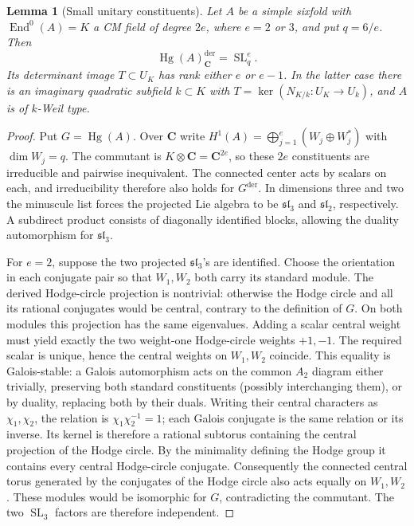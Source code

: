 \documentclass[11pt,reqno]{article}
\theoremstyle{emphasizedplain}
\theoremstyle{emphasizeddefinition}
\theoremstyle{emphasizeddefinition}
\newtheorem{prelemma}{Lemma}
\DeclareMathOperator{\End}{End}
\DeclareMathOperator{\Hg}{Hg}
\DeclareMathOperator{\SL}{SL}
\newcommand{\C}{\mathbf C}
\newcommand{\dd}{\mathrm{der}}
\begin{document}
\begin{prelemma}[Small unitary constituents]\label{p:smallunitary}
Let $A$ be a simple sixfold with $\End^0(A)=K$ a CM field of degree
$2e$, where $e=2$ or $3$, and put $q=6/e$. Then
\[
 \Hg(A)_\C^{\dd}=\SL_q^e.
\]
Its determinant image $T\subset U_K$ has rank either $e$ or $e-1$.
In the latter case there is an imaginary quadratic subfield $k\subset K$
with $T=\ker(N_{K/k}:U_K\to U_k)$, and $A$ is of $k$-Weil type.
\end{prelemma}
\begin{proof}
Put $G=\Hg(A)$. Over $\C$ write
$H^1(A)=\bigoplus_{j=1}^e(W_j\oplus W_j^*)$ with $\dim W_j=q$.
The commutant is $K\otimes\C=\C^{2e}$, so these $2e$ constituents
are irreducible and pairwise inequivalent. The connected center acts by
scalars on each, and irreducibility therefore also holds for $G^{\dd}$.
In dimensions three and two the minuscule list forces the projected
Lie algebra to be $\mathfrak{sl}_3$ and $\mathfrak{sl}_2$, respectively.
A subdirect product consists of diagonally identified blocks, allowing
the duality automorphism for $\mathfrak{sl}_3$.

For $e=2$, suppose the two projected $\mathfrak{sl}_3$'s are identified.
Choose the orientation in each conjugate pair so that $W_1,W_2$ both
carry its standard module. The derived Hodge-circle projection is
nontrivial: otherwise the Hodge circle and all its rational conjugates
would be central, contrary to the definition of $G$. On both modules
this projection has the same eigenvalues. Adding a scalar central
weight must yield exactly the two weight-one Hodge-circle weights
$+1,-1$. The required scalar is unique, hence the central weights on
$W_1,W_2$ coincide. This equality is Galois-stable: a Galois automorphism
acts on the common $A_2$ diagram either trivially, preserving both
standard constituents (possibly interchanging them), or by duality,
replacing both by their duals. Writing their central characters as
$\chi_1,\chi_2$, the relation is $\chi_1\chi_2^{-1}=1$; each
Galois conjugate is the same relation or its inverse. Its kernel is
therefore a rational subtorus containing the central projection of
the Hodge circle. By the minimality defining the Hodge group it
contains every central Hodge-circle conjugate. Consequently the connected central torus generated by the conjugates
of the Hodge circle also acts equally on $W_1,W_2$. These modules
would be isomorphic for $G$, contradicting the commutant. The two
$\SL_3$ factors are therefore independent.


\end{proof}
\end{document}
